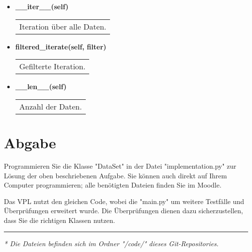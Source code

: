 \documentclass[a4paper,12pt]{article}
\begin{document}
\begin{itemize}
    \item \textbf{\_\_iter\_\_(self)} \\
    \begin{tabular}{p{\linewidth}}
    Iteration über alle Daten.
    \end{tabular}

    \item \textbf{filtered\_iterate(self, filter)} \\
    \begin{tabular}{p{\linewidth}}
    Gefilterte Iteration.
    \end{tabular}

    \item \textbf{\_\_len\_\_(self)} \\
    \begin{tabular}{p{\linewidth}}
    Anzahl der Daten.
    \end{tabular}
\end{itemize}

\section{Abgabe}
Programmieren Sie die Klasse "DataSet" in der Datei "implementation.py" zur Lösung der oben beschriebenen Aufgabe. Sie können auch direkt auf Ihrem Computer programmieren; alle benötigten Dateien finden Sie im Moodle.
\par\vspace{\baselineskip} 
\noindent Das VPL nutzt den gleichen Code, wobei die "main.py" um weitere Testfälle und Überprüfungen erweitert wurde. Die Überprüfungen dienen dazu
sicherzustellen, dass Sie die richtigen Klassen nutzen.


\vspace{1cm}
\hrule
\vspace{1cm}

\textit{* Die Dateien befinden sich im Ordner "/code/" dieses Git-Repositories.}
\end{document}
